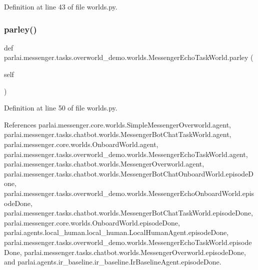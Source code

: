 Definition at line 43 of file worlds.\+py.

\mbox{\label{classparlai_1_1messenger_1_1tasks_1_1overworld__demo_1_1worlds_1_1MessengerEchoTaskWorld_a5129ca91f1ffbc87b1e6bd8229af87c7}} 
\subsubsection{\texorpdfstring{parley()}{parley()}}
{\footnotesize\ttfamily def parlai.\+messenger.\+tasks.\+overworld\+\_\+demo.\+worlds.\+Messenger\+Echo\+Task\+World.\+parley (\begin{DoxyParamCaption}\item[{}]{self }\end{DoxyParamCaption})}



Definition at line 50 of file worlds.\+py.



References parlai.\+messenger.\+core.\+worlds.\+Simple\+Messenger\+Overworld.\+agent, parlai.\+messenger.\+tasks.\+chatbot.\+worlds.\+Messenger\+Bot\+Chat\+Task\+World.\+agent, parlai.\+messenger.\+core.\+worlds.\+Onboard\+World.\+agent, parlai.\+messenger.\+tasks.\+overworld\+\_\+demo.\+worlds.\+Messenger\+Echo\+Task\+World.\+agent, parlai.\+messenger.\+tasks.\+chatbot.\+worlds.\+Messenger\+Overworld.\+agent, parlai.\+messenger.\+tasks.\+chatbot.\+worlds.\+Messenger\+Bot\+Chat\+Onboard\+World.\+episode\+Done, parlai.\+messenger.\+tasks.\+overworld\+\_\+demo.\+worlds.\+Messenger\+Echo\+Onboard\+World.\+episode\+Done, parlai.\+messenger.\+tasks.\+chatbot.\+worlds.\+Messenger\+Bot\+Chat\+Task\+World.\+episode\+Done, parlai.\+messenger.\+core.\+worlds.\+Onboard\+World.\+episode\+Done, parlai.\+agents.\+local\+\_\+human.\+local\+\_\+human.\+Local\+Human\+Agent.\+episode\+Done, parlai.\+messenger.\+tasks.\+overworld\+\_\+demo.\+worlds.\+Messenger\+Echo\+Task\+World.\+episode\+Done, parlai.\+messenger.\+tasks.\+chatbot.\+worlds.\+Messenger\+Overworld.\+episode\+Done, and parlai.\+agents.\+ir\+\_\+baseline.\+ir\+\_\+baseline.\+Ir\+Baseline\+Agent.\+episode\+Done.

